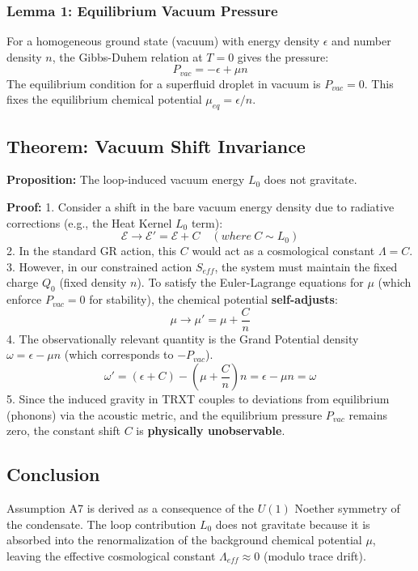 \subsubsection{Lemma 1: Equilibrium Vacuum Pressure}
For a homogeneous ground state (vacuum) with energy density $\epsilon$ and number density $n$, the Gibbs-Duhem relation at $T=0$ gives the pressure:
\begin{equation}
    P_{vac} = -\epsilon + \mu n
\end{equation}
The equilibrium condition for a superfluid droplet in vacuum is $P_{vac} = 0$. This fixes the equilibrium chemical potential $\mu_{eq} = \epsilon/n$.

\subsection{Theorem: Vacuum Shift Invariance}

\textbf{Proposition:} The loop-induced vacuum energy $L_0$ does not gravitate.

\textbf{Proof:}
1.  Consider a shift in the bare vacuum energy density due to radiative corrections (e.g., the Heat Kernel $L_0$ term):
    \begin{equation}
        \mathcal{E} \to \mathcal{E}' = \mathcal{E} + C \quad (where \ C \sim L_0)
    \end{equation}
2.  In the standard GR action, this $C$ would act as a cosmological constant $\Lambda = C$.
3.  However, in our constrained action $S_{eff}$, the system must maintain the fixed charge $Q_0$ (fixed density $n$). To satisfy the Euler-Lagrange equations for $\mu$ (which enforce $P_{vac}=0$ for stability), the chemical potential \textbf{self-adjusts}:
    \begin{equation}
        \mu \to \mu' = \mu + \frac{C}{n}
    \end{equation}
4.  The observationally relevant quantity is the Grand Potential density $\omega = \epsilon - \mu n$ (which corresponds to $-P_{vac}$).
    \begin{equation}
        \omega' = (\epsilon + C) - \left(\mu + \frac{C}{n}\right)n = \epsilon - \mu n = \omega
    \end{equation}
5.  Since the induced gravity in TRXT couples to deviations from equilibrium (phonons) via the acoustic metric, and the equilibrium pressure $P_{vac}$ remains zero, the constant shift $C$ is \textbf{physically unobservable}.

\subsection{Conclusion}
Assumption A7 is derived as a consequence of the $U(1)$ Noether symmetry of the condensate. The loop contribution $L_0$ does not gravitate because it is absorbed into the renormalization of the background chemical potential $\mu$, leaving the effective cosmological constant $\Lambda_{eff} \approx 0$ (modulo trace drift).
